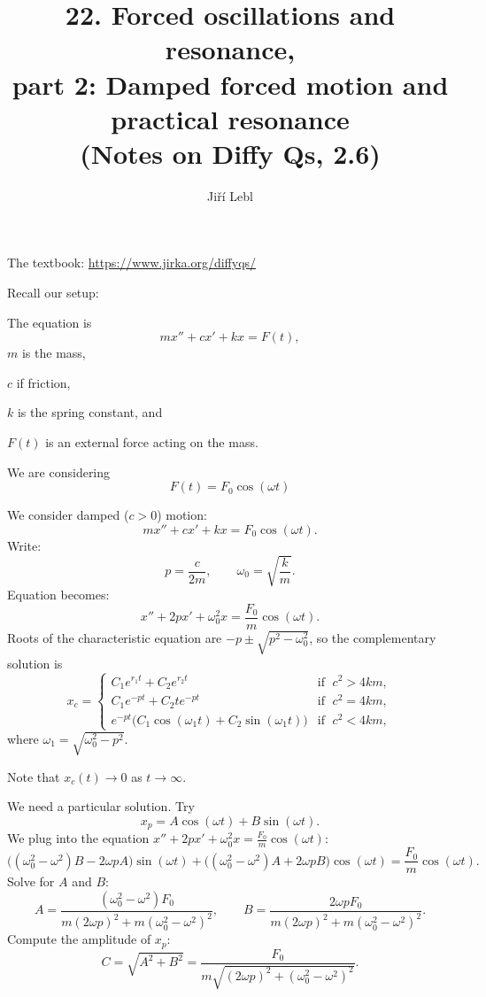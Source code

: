 \documentclass[10pt,aspectratio=169]{beamer}
\author{Ji\v{r}\'i Lebl}
\institute[OSU]{%
Oklahoma State University%
}
\title{22. Forced oscillations and resonance, \\part 2: Damped forced motion
and practical resonance\\(Notes on Diffy Qs, 2.6)}
\date{}
\begin{document}
\begin{frame}
\titlepage


\begin{center}
The textbook: \url{https://www.jirka.org/diffyqs/}
\end{center}
\end{frame}

\begin{frame}
Recall our setup:

\medskip

\hfill{}\hspace*{\fill}

\medskip
\pause

The equation is
\[
mx'' + cx' + kx = F(t) ,
\]
$m$ is the mass,

$c$ if friction,

$k$ is the spring constant, and

$F(t)$ is an external force acting on the mass.

\medskip
\pause

We are considering
\[
F(t) = F_0 \cos (\omega t)
\]
\end{frame}

\begin{frame}
We consider damped ($c > 0$) motion:
\[
mx'' + cx' + kx = F_0 \cos (\omega t) .
\]
\pause
Write:
\vspace*{-9pt}
\[
p = \frac{c}{2m},  \qquad \omega_0 = \sqrt{\frac{k}{m}} .
\]
Equation becomes:
\vspace*{-4pt}
\[
x'' + 2px' + \omega_0^2x = \frac{F_0}{m} \cos (\omega t) .
\]
\pause
Roots of the characteristic equation are
$-p \pm \sqrt{p^2 - \omega_0^2}$, so the complementary solution is
\[
x_c =
\begin{cases}
C_1 e^{r_1 t} + C_2 e^{r_2 t} & \text{if } \; c^2 > 4km , \\
C_1 e^{-p t} + C_2 t e^{-p t} & \text{if } \; c^2 = 4km , \\
e^{-p t} \bigl( C_1 \cos (\omega_1 t) + C_2 \sin (\omega_1 t) \bigr) &
  \text{if } \; c^2 < 4km ,
\end{cases}
\]
where $\omega_1 = \sqrt{\omega_0^2 - p^2}$.

\medskip
\pause

Note that
$x_c(t) \to 0$ as $t \to \infty$.
\end{frame}

\begin{frame}
We need a particular solution.  Try
\[
x_p = A \cos (\omega t) + B \sin (\omega t).
\]
\pause
We plug into the equation $x'' + 2px' + \omega_0^2x = \frac{F_0}{m} \cos
(\omega t)$:
\[
\bigl((\omega_0^2  - \omega^2)B - 2\omega p A\bigr) \sin (\omega t)
+
\bigl((\omega_0^2  - \omega^2)A + 2\omega p B\bigr) \cos (\omega t)
=
\frac{F_0}{m} \cos (\omega t) .
\]
\pause
Solve for $A$ and $B$:
\[
A=\frac{(\omega_0^2-\omega^2) F_0}
{m{(2\omega p)}^2+m{(\omega_0^2-\omega^2)}^2} ,
\qquad
B=\frac{2 \omega p F_0}
{m{(2\omega p)}^2+m{(\omega_0^2-\omega^2)}^2} .
\]
Compute the amplitude of $x_p$:
\[
C = \sqrt{A^2+B^2} = \frac{F_0}{m \sqrt{{(2\omega p)}^2+{(\omega_0^2-\omega^2)}^2}} .
\]
\end{frame}
\end{document}
